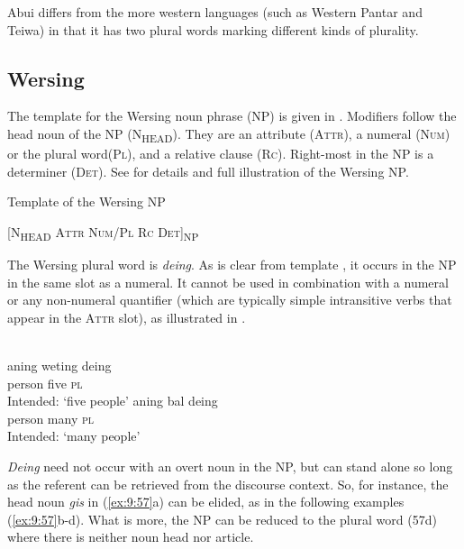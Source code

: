 Abui differs from the more western languages (such as Western Pantar and Teiwa) in that it has two plural words marking different kinds of plurality.

\subsection{Wersing} %
\label{sec:9:3.5}
The template for the Wersing noun phrase (NP) is given in . Modifiers follow the head noun of the NP (\textsc{N}\textsubscript{\upshape \MakeUppercase{head}}). They are an attribute (\textsc{Attr}), a numeral (\textsc{Num}) or the plural word\textsc{(Pl),} and a relative clause (\textsc{Rc).} \textsc{R}ight-most in the NP is a determiner (\textsc{Det}). See \citet{SchapperEtAltawersing} for details and full illustration of the Wersing NP.

\ea%
\label{ex:9:55}
\upshape 
 Template of the Wersing NP 

  [\textsc{N}\textsubscript{\upshape \MakeUppercase{head } }\textsc{Attr Num/Pl  Rc  Det]}\textsc{\textsubscript{\upshape NP}}
\z


The Wersing plural word is \textit{deing}. As is clear from template , it occurs in the NP in the same slot as a numeral. It cannot be used in combination with a numeral or any non-numeral quantifier (which are typically simple intransitive verbs that appear in the \textsc{Attr} slot), as illustrated in .


\ea%
\label{ex:9:56}
 \\
\ea
\gll *aning    weting deing \\
    person five \textsc{pl} \\
 \glt Intended: `five people'
\ex
\gll *aning bal {deing}\\
   person many   \textsc{pl} \\
\glt  Intended: `many people'
\z
\z






\textit{Deing} need not occur with an overt noun in the NP, but can stand alone so long as the referent can be retrieved from the discourse context. So, for instance, the head noun \textit{gis} in (\ref{ex:9:57}a) can be elided, as in the following examples (\ref{ex:9:57}b-d). What is more, the NP can be reduced to the plural word (57d) where there is neither noun head nor article.



